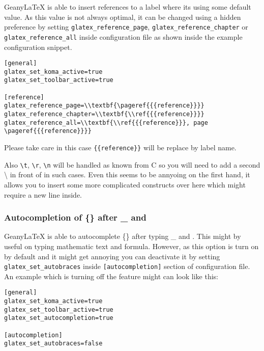 \documentclass[%
paper=a4,%
fontsize=11pt,%
twoside=false,%
DIV18,%
headsepline,%
plainheadsepline,%
footsepline,%
plainfootsepline,%
bibliography=totoc,%
listof=totoc,%
BCOR10mm,%
parskip=half,%
openany,%
]{scrartcl}
\begin{document}
Geany\LaTeX{} is able to insert references to a label where its
using some default value. As this value is not always optimal, it
can be changed using a hidden preference by setting
\texttt{glatex\_reference\_page}, \texttt{glatex\_reference\_chapter} or
\texttt{glatex\_reference\_all} inside configuration file as shown inside
the example configuration snippet.

\begin{lstlisting}[caption={Configuration example for customized reference strings}]
[general]
glatex_set_koma_active=true
glatex_set_toolbar_active=true

[reference]
glatex_reference_page=\\textbf{\pageref{{{reference}}}}
glatex_reference_chapter=\\textbf{\\ref{{{reference}}}}
glatex_reference_all=\\textbf{\\ref{{{reference}}}, page \pageref{{{reference}}}}
\end{lstlisting}

Please take care in this case \texttt{\{\{reference\}\}} will be
replace by label name.

Also \texttt{\textbackslash{}t}, \texttt{\textbackslash{}r},
\texttt{\textbackslash{}n} will be handled as known from C so you will
need to add a second \textbackslash{} in front of in such cases. Even
this seems to be annyoing on the first hand, it allows you to insert some
more complicated constructs over  here which might require a new line inside.


\subsubsection{Autocompletion of \{\} after \_ and }
\label{sec:autoadding_of_braces}
Geany\LaTeX{} is able to autocomplete \{\} after typing \_ and
. This might by useful on typing mathematic text and
formula. However, as this option is turn on by default and it might
get annoying you can deactivate it by setting \texttt{glatex\_set\_autobraces}
inside \texttt{[autocompletion]} section of configuration file. An example
which is turning off the feature might can look like this:

\begin{lstlisting}[caption={Configuration example for autocompletion of %
							\{\} after \_ and \symbol{94}}]
[general]
glatex_set_koma_active=true
glatex_set_toolbar_active=true
glatex_set_autocompletion=true

[autocompletion]
glatex_set_autobraces=false
\end{lstlisting}
\end{document}
